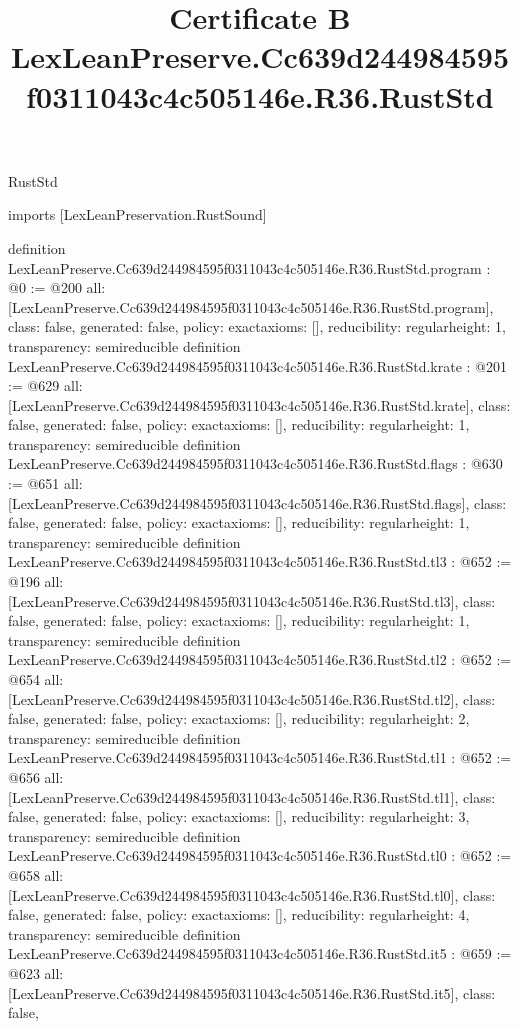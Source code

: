 \begin{lexlean}{RustStd}
\title{Certificate B LexLeanPreserve.Cc639d244984595f0311043c4c505146e.R36.RustStd}
\begin{coremodule}
imports [LexLeanPreservation.RustSound]

definition LexLeanPreserve.Cc639d244984595f0311043c4c505146e.R36.RustStd.program : @0 := @200 {
  all: [LexLeanPreserve.Cc639d244984595f0311043c4c505146e.R36.RustStd.program],
  class: false,
  generated: false,
  policy: exact{axioms: []},
  reducibility: regular{height: 1},
  transparency: semireducible
}
definition LexLeanPreserve.Cc639d244984595f0311043c4c505146e.R36.RustStd.krate : @201 := @629 {
  all: [LexLeanPreserve.Cc639d244984595f0311043c4c505146e.R36.RustStd.krate],
  class: false,
  generated: false,
  policy: exact{axioms: []},
  reducibility: regular{height: 1},
  transparency: semireducible
}
definition LexLeanPreserve.Cc639d244984595f0311043c4c505146e.R36.RustStd.flags : @630 := @651 {
  all: [LexLeanPreserve.Cc639d244984595f0311043c4c505146e.R36.RustStd.flags],
  class: false,
  generated: false,
  policy: exact{axioms: []},
  reducibility: regular{height: 1},
  transparency: semireducible
}
definition LexLeanPreserve.Cc639d244984595f0311043c4c505146e.R36.RustStd.tl3 : @652 := @196 {
  all: [LexLeanPreserve.Cc639d244984595f0311043c4c505146e.R36.RustStd.tl3],
  class: false,
  generated: false,
  policy: exact{axioms: []},
  reducibility: regular{height: 1},
  transparency: semireducible
}
definition LexLeanPreserve.Cc639d244984595f0311043c4c505146e.R36.RustStd.tl2 : @652 := @654 {
  all: [LexLeanPreserve.Cc639d244984595f0311043c4c505146e.R36.RustStd.tl2],
  class: false,
  generated: false,
  policy: exact{axioms: []},
  reducibility: regular{height: 2},
  transparency: semireducible
}
definition LexLeanPreserve.Cc639d244984595f0311043c4c505146e.R36.RustStd.tl1 : @652 := @656 {
  all: [LexLeanPreserve.Cc639d244984595f0311043c4c505146e.R36.RustStd.tl1],
  class: false,
  generated: false,
  policy: exact{axioms: []},
  reducibility: regular{height: 3},
  transparency: semireducible
}
definition LexLeanPreserve.Cc639d244984595f0311043c4c505146e.R36.RustStd.tl0 : @652 := @658 {
  all: [LexLeanPreserve.Cc639d244984595f0311043c4c505146e.R36.RustStd.tl0],
  class: false,
  generated: false,
  policy: exact{axioms: []},
  reducibility: regular{height: 4},
  transparency: semireducible
}
definition LexLeanPreserve.Cc639d244984595f0311043c4c505146e.R36.RustStd.it5 : @659 := @623 {
  all: [LexLeanPreserve.Cc639d244984595f0311043c4c505146e.R36.RustStd.it5],
  class: false,
}
\end{coremodule}
\end{lexlean}
